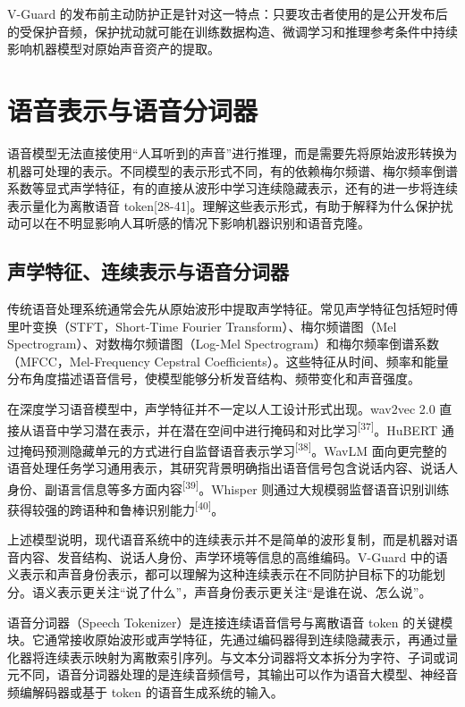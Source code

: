 V-Guard
的发布前主动防护正是针对这一特点：只要攻击者使用的是公开发布后的受保护音频，保护扰动就可能在训练数据构造、微调学习和推理参考条件中持续影响机器模型对原始声音资产的提取。

\section{语音表示与语音分词器}\label{ux8bedux97f3ux8868ux793aux4e0eux8bedux97f3ux5206ux8bcdux5668}

语音模型无法直接使用``人耳听到的声音''进行推理，而是需要先将原始波形转换为机器可处理的表示。不同模型的表示形式不同，有的依赖梅尔频谱、梅尔频率倒谱系数等显式声学特征，有的直接从波形中学习连续隐藏表示，还有的进一步将连续表示量化为离散语音
token{[}28-41{]}。理解这些表示形式，有助于解释为什么保护扰动可以在不明显影响人耳听感的情况下影响机器识别和语音克隆。

\subsection{声学特征、连续表示与语音分词器}\label{ux58f0ux5b66ux7279ux5f81ux8fdeux7eedux8868ux793aux4e0eux8bedux97f3ux5206ux8bcdux5668}

传统语音处理系统通常会先从原始波形中提取声学特征。常见声学特征包括短时傅里叶变换（STFT，Short-Time
Fourier Transform）、梅尔频谱图（Mel
Spectrogram）、对数梅尔频谱图（Log-Mel
Spectrogram）和梅尔频率倒谱系数（MFCC，Mel-Frequency Cepstral
Coefficients）。这些特征从时间、频率和能量分布角度描述语音信号，使模型能够分析发音结构、频带变化和声音强度。

在深度学习语音模型中，声学特征并不一定以人工设计形式出现。wav2vec 2.0
直接从语音中学习潜在表示，并在潜在空间中进行掩码和对比学习\textsuperscript{{[}37{]}}。HuBERT
通过掩码预测隐藏单元的方式进行自监督语音表示学习\textsuperscript{{[}38{]}}。WavLM
面向更完整的语音处理任务学习通用表示，其研究背景明确指出语音信号包含说话内容、说话人身份、副语言信息等多方面内容\textsuperscript{{[}39{]}}。Whisper
则通过大规模弱监督语音识别训练获得较强的跨语种和鲁棒识别能力\textsuperscript{{[}40{]}}。

上述模型说明，现代语音系统中的连续表示并不是简单的波形复制，而是机器对语音内容、发音结构、说话人身份、声学环境等信息的高维编码。V-Guard
中的语义表示和声音身份表示，都可以理解为这种连续表示在不同防护目标下的功能划分。语义表示更关注``说了什么''，声音身份表示更关注``是谁在说、怎么说''。

语音分词器（Speech Tokenizer）是连接连续语音信号与离散语音 token
的关键模块。它通常接收原始波形或声学特征，先通过编码器得到连续隐藏表示，再通过量化器将连续表示映射为离散索引序列。与文本分词器将文本拆分为字符、子词或词元不同，语音分词器处理的是连续音频信号，其输出可以作为语音大模型、神经音频编解码器或基于
token 的语音生成系统的输入。

